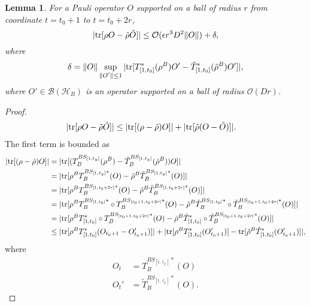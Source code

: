 \documentclass[prx,aps,amsmath,amssymb,floatfix,superscriptaddress,11pt,tightenlines,longbibliography,onecolumn,notitlepage]{revtex4-1}
\newcommand{\Tr}{\textnormal{tr}}
\newcommand{\trant}[2]{T_{B}^{BS_{[#1 , #2]}}}
\newcommand{\ttrant}[2]{\tilde{T}_{B}^{BS_{[#1 , #2]}}}
\newcommand{\trantd}[2]{T_{B}^{BS_{[#1 , #2]}*}}
\newcommand{\ttrantd}[2]{\tilde{T}_{B}^{BS_{[#1 , #2]}*}}
\newtheorem{lem}{Lemma}
\begin{document}
\begin{lem}
  For a Pauli operator $O$ supported on a ball of radius $r$ from coordinate $t=t_0+1$ to $t=t_0+2r$,
  \begin{equation}
    |\Tr[\rho O - \tilde{\rho}\tilde O]| \leq \mathcal{O}(\epsilon r^3D^2\|O \|) + \delta,
    \end{equation}
where 
\begin{equation}
  \delta =\|O \| \sup_{\substack{\|O' \|\leq 1}}|\Tr[T_{[1,t_0]}^*(\rho^B) O' - \tilde{T}_{[1,t_0]}^*(\tilde{\rho}^B) O']|,
\end{equation}
where $O'\in \mathcal{B}(\mathcal{H}_B)$ is an operator supported on a ball of radius $\mathcal{O}(Dr)$. 
\label{lemma:Heisenberg}
\end{lem}
\begin{proof}
  \begin{equation}
    \begin{aligned}
      |\Tr[\rho O - \tilde{\rho} \tilde{O}]| &\leq |\Tr[(\rho - \tilde{\rho}) O]| + |\Tr[\tilde{\rho}(O-\tilde{O})]|.
    \end{aligned}
  \end{equation}
  The first term is bounded as
  \begin{equation}
    \begin{aligned}
      |\Tr[(\rho -\tilde{\rho})O]| &= |\Tr[(\trant{1}{\ell_y}(\rho^B) - \ttrant{1}{\ell_y}(\tilde{\rho}^B))O]| \\
      &=|\Tr[\rho^B\trantd{1}{\ell_y}(O) - \tilde{\rho}^B\ttrantd{1}{\ell_y}(O)]| \\
      &=|\Tr[\rho^B\trantd{1}{t_0+2r}(O) - \tilde{\rho}^B\ttrantd{1}{t_0+2r}(O)]| \\
      &=|\Tr[\rho^B\trantd{1}{t_0}\circ \trantd{t_0+1}{t_0+2r}(O) - \tilde{\rho}^B\ttrantd{1}{t_0}\circ \ttrantd{t_0+1}{t_0+2r}(O)]| \\
      &=|\Tr[\rho^BT_{[1,t_0]}^*\circ \trantd{t_0+1}{t_0+2r}(O) - \tilde{\rho}^B\tilde{T}_{[1,t_0]}^*\circ \ttrantd{t_0+1}{t_0+2r}(O)]| \\
     &\leq |\Tr[\rho^BT_{[1,t_0]}^*(O_{t_0+1} - O_{t_0+1}') ]| + |\Tr[\rho^BT_{[1,t_0]}^*(O_{t_0+1}')] - \Tr[\tilde{\rho}^B \tilde{T}_{[1,t_0]}^*(O_{t_0+1}')]|,
    \end{aligned}
  \end{equation}
  where
  \begin{equation}
    \begin{aligned}
    O_{t} &= \trantd{t}{\ell_y}(O)\\
    O_{t}' &= \ttrantd{t}{\ell_y}(O).

\end{aligned}
\end{equation}
\end{proof}
\end{document}
